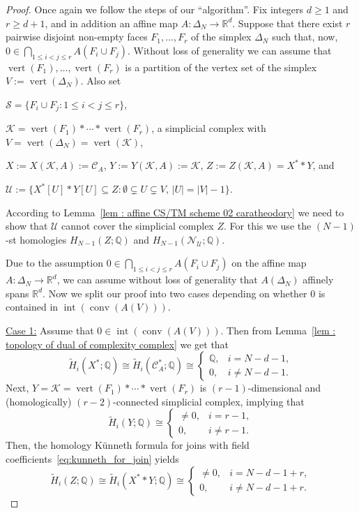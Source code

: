 \documentclass[a4paper,11pt,reqno, english]{amsart}
\theoremstyle{definition}
\theoremstyle{remark}
\newcommand\R{\mathbb R}
\newcommand\Q{\mathbb Q}
\newcommand\NN{\mathscr N}
\newcommand\U{\mathscr U}
\newcommand\CC{\mathscr C}
\DeclareMathOperator{\vertex}{\mathrm{vert}}
\DeclareMathOperator{\interior}{\mathrm{int}}
\DeclareMathOperator{\conv}{\mathrm{conv}}
\begin{document}
\begin{proof}
	Once again we follow the steps of our ``algorithm''.
	Fix integers $d\geq 1$ and $r\geq d+1$, and in addition an affine map $A\colon \Delta_N\longrightarrow\R^d$.
	Suppose that there exist $r$ pairwise disjoint non-empty faces $F_1,\dots, F_{r}$ of the simplex $\Delta_N$ such that, now,
	$
		0\in \bigcap_{1\leq i<j\leq r} A(F_i\cup F_j)
	$.
	Without loss of generality we can assume that $\vertex(F_1),\dots ,\vertex(F_{r})$ is a partition of the vertex set of the simplex $V:=\vertex(\Delta_N)$.
	Also set
	\begin{compactitem}[\rm \quad --]
		\item $\mathcal{S}=\{F_i\cup F_j :  1\leq i<j\leq r\}$,
		\item $\mathcal{K}=\vertex(F_1)*\cdots*\vertex(F_{r})$, a simplicial complex with $V=\vertex(\Delta_N)=\vertex(\mathcal{K})$,
		\item $X:=X(\mathcal{K},A):=\CC_A$, $Y:=Y(\mathcal{K},A):=\mathcal{K}$,   $Z:=Z(\mathcal{K},A)=X^**Y$, and
		\item $\U := \big\{ X^*[U]*Y[U] \subseteq Z : \emptyset\subsetneq U \subsetneq V,\, |U|=|V|-1\big\}$.
	\end{compactitem}
	According to Lemma~\ref{lem : affine CS/TM scheme 02 caratheodory} we need to show that $\U$ cannot cover the simplicial complex $Z$.
	For this we use the $(N-1)$-st homologies $H_{N-1}(Z;\Q)$ and $H_{N-1}(\NN_{\U};\Q)$.

	\medskip
	Due to the assumption $0\in \bigcap_{1\leq i<j\leq r} A(F_i\cup F_j)$ on the affine map $A\colon \Delta_N\longrightarrow\R^d$, we can assume without loss of generality that $A(\Delta_N)$ affinely spans $\R^d$.
	Now we split our proof into two cases depending on whether $0$ is contained in $\interior(\conv (A(V)))$.

	\medskip\noindent\ul{Case 1:} Assume that $0\in \interior(\conv (A(V)))$.
	Then from Lemma~\ref{lem : topology of dual of complexity complex} we  get that
	\[
		\widetilde{H}_i(X^*;\Q)\cong \widetilde{H}_i(\CC_A^*;\Q) \cong
		\begin{cases}
			\Q, & i= N-d-1 ,    \\
			0,  & i\neq N-d-1 .
		\end{cases}
	\]
	Next, $Y=\mathcal{K}=\vertex ({F_1})*\cdots* \vertex ({F_r})$ is $(r-1)$-dimensional and (homologically) $(r-2)$-connected simplicial complex, implying that
	\[
		\widetilde{H}_i(Y;\Q) \cong
		\begin{cases}
			\neq 0, & i= r-1,    \\
			0,      & i\neq r-1.
		\end{cases}
	\]
	Then, the homology K\"unneth formula for joins with field coefficients~\eqref{eq:kunneth_for_join} yields
	\begin{equation}\label{eq : homology of Z -- C03}
		\widetilde{H}_i(Z;\Q) \cong \widetilde{H}_i(X^**Y;\Q) \cong
		\begin{cases}
			\neq 0, & i= N-d-1+r,      \\
			0,      & i\neq  N-d-1+r .
		\end{cases}
	\end{equation}




\end{proof}
\end{document}
